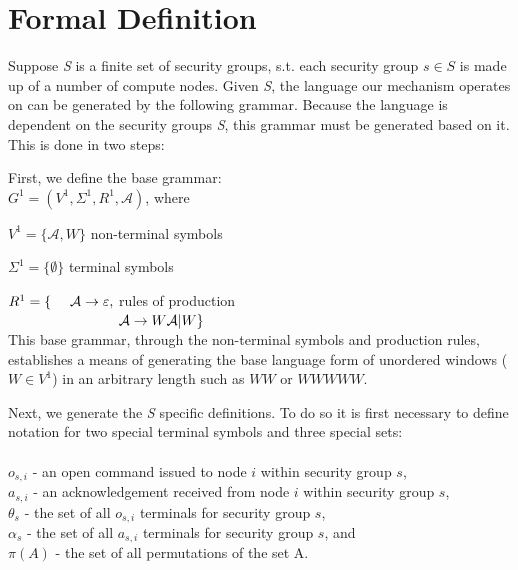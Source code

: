 \documentclass[oneside,12pt]{memoir}
\newcommand{\tab}{\hspace*{2em}}
\begin{document}
\chapter{Formal Definition}

Suppose \emph{S} is a finite set of security groups, s.t. each security group $s\in S$ is made up of a number of compute nodes. Given \emph{S}, the language our mechanism operates on can be generated by the following grammar. Because the language is dependent on the security groups \emph{S}, this grammar must be generated based on it. This is done in two steps:

First, we define the base grammar:\\

\tab $G^1 = (V^1, \Sigma^1, R^1, \mathcal{A})$, where

\tab $V^1 = \{\mathcal{A} , W\}$ \hfill non-terminal symbols \hspace*{6em}

\tab $\Sigma ^1 = \{ \emptyset\}$ \hfill terminal symbols\hspace*{6.3em}

\tab $R^1 = \lbrace \hspace*{1.35em}\mathcal{A} \rightarrow \varepsilon ,$ \hfill rules of production \hspace*{6em} \\
$\tab \hspace*{5.9em} \mathcal{A}\rightarrow W\mathcal{A} |W\rbrace$\\

This base grammar, through the non-terminal symbols and production rules, establishes a means of generating the base language form of unordered windows ($W\in V^1$) in an arbitrary length such as $WW$ or $WWWWW$.

Next, we generate the \emph{S} specific definitions. To do so it is first necessary to define notation for two special terminal symbols and three special sets:\\
\\
$o_{s,i}$ - an open command issued to node $i$ within security group $s$,\\
$a_{s,i}$ - an acknowledgement received from node $i$ within security group $s$,\\
$\theta_s$ - the set of all $o_{s,i}$ terminals for security group $s$, \\
$\alpha_s$ - the set of all $a_{s,i}$ terminals for security group $s$, and \\
$\pi(A)$ - the set of all permutations of the set A.\\
\end{document}
